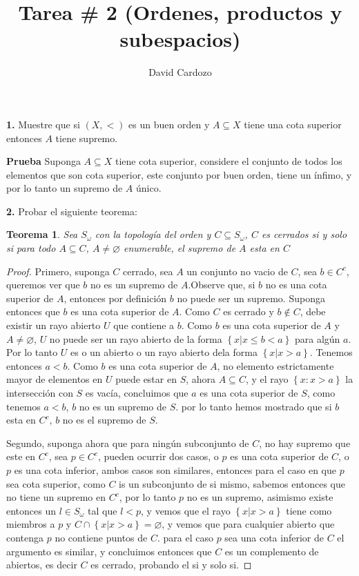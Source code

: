 \documentclass[notitlepage]{article}
\author{David Cardozo}
\title{Tarea \# 2 (Ordenes, productos y subespacios)}
\newtheorem{thm}{Teorema}
\newcommand{\set}[1]{\left\lbrace #1 \right\rbrace}
\newcommand{\contained}{\subseteq}
\begin{document}
\maketitle

\textbf{1.} Muestre que si $ (X, < )$ es un buen orden y $A \contained X$ tiene una cota superior entonces $A$ tiene supremo.

\textbf{Prueba}
Suponga $A \contained X$ tiene cota superior, considere el conjunto de todos los elementos que son cota superior, este conjunto por buen orden, tiene un ínfimo, y por lo tanto un supremo de $A$ único.

\textbf{2.} Probar el siguiente teorema:

\begin{thm}
	Sea $S_{\omega} $ con la topología del orden  y $ C \subseteq S_\omega $, $C $ es cerrados si y solo si para todo $A \contained C$, $ A \neq \varnothing$ enumerable, el supremo de $A$ esta en $C$
\end{thm}

\begin{proof}
	Primero, suponga $C$ cerrado, sea $A$ un conjunto no vacio de $C$, sea $b \in C^c$, queremos ver que $b$ no es un supremo de $A$.Observe que, si $b$ no es una cota superior de $A$, entonces por definición $b$ no puede ser un supremo. Suponga entonces que $b$ es una cota superior de $A$. Como $C$ es cerrado y $b \notin C$, debe existir un rayo abierto $U$ que contiene a $b$. Como $b$ es una cota superior de $A$ y $A \neq \varnothing$, $U$ no puede ser un rayo abierto de la forma $\set{x | x \leq b < a} $ para algún $a$. Por lo tanto $U$ es o un abierto o un rayo abierto dela forma $ \set{x | x > a} $. Tenemos entonces $ a < b$. Como $b$ es una cota superior de $A$, no elemento estrictamente mayor de elementos en $U$ puede estar en $S$, ahora $ A \contained C$, y el rayo $\set{x : x > a}$ la intersección con $S$ es vacía, concluimos que $a$ es una cota superior de $S$, como tenemos $ a < b$, $b$ no es un supremo de $S$. por lo tanto hemos mostrado que si $b$ esta en $C^c$, $b$ no es el supremo de $S$.
	
	 Segundo, suponga ahora que para ningún subconjunto de $C$, no hay supremo que este en $ C^c$, sea $ p \in C^c$, pueden ocurrir dos casos, o $p$ es una cota superior de $C$, o $p$ es una cota inferior, ambos casos son similares, entonces para el caso en que $p$ sea cota superior, como $C$ is un subconjunto de si mismo, sabemos entonces que no tiene un supremo en $C^c$, por lo tanto $p$ no es un supremo, asimismo existe entonces un $l \in S_\omega$ tal que $ l < p$, y vemos que el rayo $\set{x | x>a} $ tiene como miembros a $p$ y $ C \cap \set{x | x>a} = \varnothing $, y vemos que para cualquier abierto que contenga $p$ no contiene puntos de $C$. para el caso $p$ sea una cota inferior de $C$ el argumento es similar, y concluimos entonces que $C$ es un complemento de abiertos, es decir $C$ es cerrado, probando el si y solo si.
	 
\end{proof}
\end{document}
